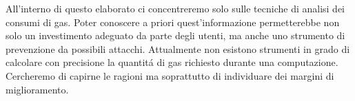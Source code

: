\documentclass[a4paper,12pt]{report}
\begin{document}
All'interno di questo elaborato ci concentreremo solo sulle tecniche di analisi dei consumi di gas. Poter conoscere a priori quest'informazione permetterebbe non solo un investimento adeguato da parte degli utenti, ma anche uno strumento di prevenzione da possibili attacchi.\newline
Attualmente non esistono strumenti in grado di calcolare con precisione la quantit\'a di gas richiesto durante una computazione. Cercheremo di capirne le ragioni ma soprattutto di individuare dei margini di miglioramento.  
\end{document}
